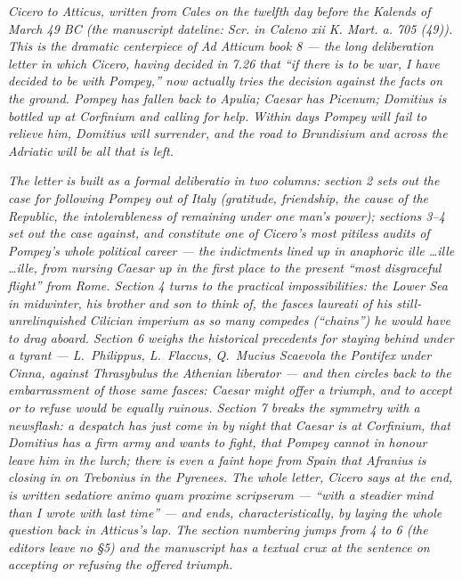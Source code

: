 
\textit{Cicero to Atticus, written from Cales on the
twelfth day before the Kalends of March 49 BC (the
manuscript dateline: \textit{Scr. in Caleno xii K.
Mart. a. 705 (49)}). This is the dramatic centerpiece
of \textit{Ad Atticum} book 8 --- the long deliberation
letter in which Cicero, having decided in 7.26 that ``if
there is to be war, I have decided to be with Pompey,''
now actually tries the decision against the facts on
the ground. Pompey has fallen back to Apulia; Caesar
has Picenum; Domitius is bottled up at Corfinium and
calling for help. Within days Pompey will fail to
relieve him, Domitius will surrender, and the road to
Brundisium and across the Adriatic will be all that is
left.}

\textit{The letter is built as a formal
\textit{deliberatio} in two columns: section 2 sets out
the case for following Pompey out of Italy (gratitude,
friendship, the cause of the Republic, the
intolerableness of remaining under one man's power);
sections 3--4 set out the case against, and constitute
one of Cicero's most pitiless audits of Pompey's whole
political career --- the indictments lined up in
anaphoric \textit{ille \dots ille \dots ille}, from
nursing Caesar up in the first place to the present
``most disgraceful flight'' from Rome. Section 4 turns
to the practical impossibilities: the Lower Sea in
midwinter, his brother and son to think of, the
\textit{fasces laureati} of his still-unrelinquished
Cilician imperium as so many \textit{compedes}
(``chains'') he would have to drag aboard. Section 6
weighs the historical precedents for staying behind
under a tyrant --- L.~Philippus, L.~Flaccus, Q.~Mucius
Scaevola the Pontifex under Cinna, against Thrasybulus
the Athenian liberator --- and then circles back to the
embarrassment of those same fasces: Caesar might offer
a triumph, and to accept or to refuse would be equally
ruinous. Section 7 breaks the symmetry with a
newsflash: a despatch has just come in by night that
Caesar is at Corfinium, that Domitius has a firm army
and wants to fight, that Pompey cannot in honour leave
him in the lurch; there is even a faint hope from Spain
that Afranius is closing in on Trebonius in the
Pyrenees. The whole letter, Cicero says at the end, is
written \textit{sedatiore animo quam proxime
scripseram} --- ``with a steadier mind than I wrote
with last time'' --- and ends, characteristically, by
laying the whole question back in Atticus's lap. The
section numbering jumps from 4 to 6 (the editors leave
no §5) and the manuscript has a textual crux at the
sentence on accepting or refusing the offered
triumph.}
